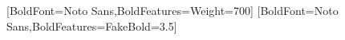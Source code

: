 %
\ifluatex
  \setmainfont{Noto Sans}[BoldFont={Noto Sans},BoldFeatures={Weight=700}]
\else
  \setmainfont{Noto Sans}[BoldFont={Noto Sans},BoldFeatures={FakeBold=3.5}]
\fi
\usepackage[letterpaper,margin=1.3in]{geometry}  %
\usepackage{setspace}         %
\raggedbottom                                  %

\newcommand{\swTitleLogo}{}

